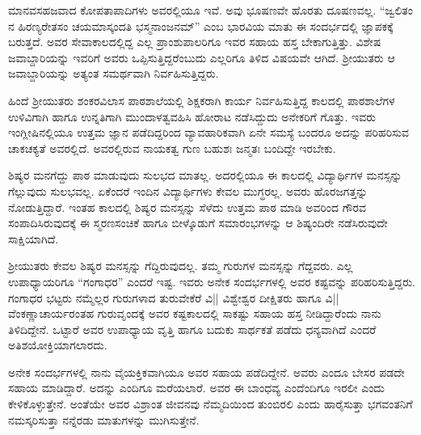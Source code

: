 ಮಾನವಸಹಜವಾದ ಕೋಪತಾಪಾದಿಗಳು ಅವರಲ್ಲಿಯೂ ಇವೆ. ಅವು ಭೂಷಣವೇ ಹೊರತು ದೂಷಣವಲ್ಲ. “ಜ್ವಲಿತಂ ನ ಹಿರಣ್ಯರೇತಸಂ ಚಯಮಾಸ್ಕಂದತಿ ಭಸ್ಮನಾಂಜನಮ್” ಎಂಬ ಭಾರವಿಯ ಮಾತು ಈ ಸಂದರ್ಭದಲ್ಲಿ ಜ್ಞಾಪಕಕ್ಕೆ ಬರುತ್ತದೆ. ಅವರ ಸೇವಾಕಾಲದಲ್ಲಿದ್ದ ಎಲ್ಲ ಪ್ರಾಂಶುಪಾಲರಿಗೂ ಇವರ ಸಹಾಯ ಹಸ್ತ ಬೇಕಾಗುತ್ತಿತ್ತು. ವಿಶೇಷ ಜವಾಬ್ದಾರಿಯನ್ನು ಇವರಿಗೆ ಅವರು ಒಪ್ಪಿಸುತ್ತಿದ್ದರೆಂಬುದು ಎಲ್ಲರಿಗೂ ತಿಳಿದ ವಿಷಯವೇ ಆಗಿದೆ. ಶ್ರೀಯುತರು ಆ ಜವಾಬ್ದಾರಿಯನ್ನು ಅತ್ಯಂತ ಸಮರ್ಥವಾಗಿ ನಿರ್ವಹಿಸುತ್ತಿದ್ದರು.

ಹಿಂದೆ ಶ್ರೀಯುತರು ಶಂಕರವಿಲಾಸ ಪಾಠಶಾಲೆಯಲ್ಲಿ ಶಿಕ್ಷಕರಾಗಿ ಕಾರ್ಯ ನಿರ್ವಹಿಸುತ್ತಿದ್ದ ಕಾಲದಲ್ಲಿ ಪಾಠಶಾಲೆಗಳ ಉಳಿವಿಗಾಗಿ ಹಾಗೂ ಉನ್ನತಿಗಾಗಿ ಮುಂದಾಳತ್ವವಹಿಸಿ ಹೋರಾಟ ನಡೆಸಿದ್ದುದು ಅನೇಕರಿಗೆ ಗೊತ್ತು. ಇವರು ಇಂಗ್ಲೀಷಿನಲ್ಲಿಯೂ ಉತ್ತಮ ಜ್ಞಾನ ಪಡೆದಿದ್ದರಿಂದ ವ್ಯಾವಹಾರಿಕವಾಗಿ ಏನೇ ಸಮಸ್ಯೆ ಬಂದರೂ ಅದನ್ನು ಪರಿಹರಿಸುವ ಚಾಕಚಕ್ಯತೆ ಅವರಲ್ಲಿದೆ. ಅವರಲ್ಲಿರುವ ನಾಯಕತ್ವ ಗುಣ ಬಹುಶಃ ಜನ್ಮತಃ ಬಂದಿದ್ದೇ ಇರಬೇಕು.

ಶಿಷ್ಯರ ಮನಗೆದ್ದು ಪಾಠ ಮಾಡುವುದು ಸುಲಭದ ಮಾತಲ್ಲ. ಅದರಲ್ಲಿಯೂ ಈ ಕಾಲದಲ್ಲಿ ವಿದ್ಯಾರ್ಥಿಗಳ ಮನಸ್ಸನ್ನು ಗೆಲ್ಲುವುದು ಸುಲಭವಲ್ಲ. ಏಕೆಂದರೆ ಇಂದಿನ ವಿದ್ಯಾರ್ಥಿಗಳು ಕೇವಲ ಮುಗ್ಧರಲ್ಲ. ಅವರು ಹೊರಜಗತ್ತನ್ನು ನೋಡುತ್ತಿದ್ದಾರೆ. ಇಂತಹ ಕಾಲದಲ್ಲಿ ಶಿಷ್ಯರ ಮನಸ್ಸನ್ನು ಸೆಳೆದು ಉತ್ತಮ ಪಾಠ ಮಾಡಿ ಅವರಿಂದ ಗೌರವ ಸಂಪಾದಿಸಿರುವುದಕ್ಕೆ ಈ ಸ್ಮರಣಸಂಚಿಕೆ ಹಾಗೂ ಬೀಳ್ಕೊಡುಗೆ ಸಮಾರಂಭಗಳನ್ನು ಆ ಶಿಷ್ಯಂದಿರೇ ನಡೆಸಿರುವುದೇ ಸಾಕ್ಷಿಯಾಗಿದೆ.

ಶ್ರೀಯುತರು ಕೇವಲ ಶಿಷ್ಯರ ಮನಸ್ಸನ್ನು ಗೆದ್ದಿರುವುದಲ್ಲ. ತಮ್ಮ ಗುರುಗಳ ಮನಸ್ಸನ್ನು ಗೆದ್ದವರು. ಎಲ್ಲ ಉಪಾಧ್ಯಾಯರಿಗೂ “ಗಂಗಾಧರ” ಎಂದರೆ ಇಷ್ಟ. ಇವರು ಅನೇಕ ಸಂದರ್ಭಗಳಲ್ಲಿ ಅವರ ಕಷ್ಟವನ್ನು ಪರಿಹರಿಸುತ್ತಿದ್ದರು. ಗಂಗಾಧರ ಭಟ್ಟರು ನಮ್ಮೆಲ್ಲರ ಗುರುಗಳಾದ ತುರುವೇಕೆರೆ ವಿ|| ವಿಶ್ವೇಶ್ವರ ದೀಕ್ಷಿತರು ಹಾಗೂ ವಿ|| ವೆಂಕಣ್ಣಾಚಾರ್ಯರಂತಹ ಗುರುವೃಂದಕ್ಕೆ ಅವರ ಕಷ್ಟಕಾಲದಲ್ಲಿ ಸಾಕಷ್ಟು ಸಹಾಯ ಹಸ್ತ ನೀಡಿದ್ದಾರೆಂದು ನಾನು ತಿಳಿದಿದ್ದೇನೆ. ಒಟ್ಟಾರೆ ಅವರ ಉಪಾಧ್ಯಾಯ ವೃತ್ತಿ ಹಾಗೂ ಬದುಕು ಸಾರ್ಥಕತೆ ಪಡೆದು ಧನ್ಯವಾಗಿದೆ ಎಂದರೆ ಅತಿಶಯೋಕ್ತಿಯಾಗಲಾರದು.

ಅನೇಕ ಸಂದರ್ಭಗಳಲ್ಲಿ ನಾನು ವೈಯಕ್ತಿಕವಾಗಿಯೂ ಅವರ ಸಹಾಯ ಪಡೆದಿದ್ದೇನೆ. ಅವರು ಎಂದೂ ಬೇಸರ ಪಡದೇ ಸಹಾಯ ಮಾಡಿದ್ದಾರೆ. ಅದನ್ನು ಎಂದಿಗೂ ಮರೆಯಲಾರೆ. ಅವರ ಈ ಬಾಂಧವ್ಯ ಎಂದೆಂದಿಗೂ ಇರಲೀ ಎಂದು ಕೇಳಿಕೊಳ್ಳುತ್ತೇನೆ. ಅಂತೆಯೇ ಅವರ ವಿಶ್ರಾಂತ ಜೀವನವು ನೆಮ್ಮದಿಯಿಂದ ತುಂಬಿರಲಿ ಎಂದು ಹಾರೈಸುತ್ತಾ ಭಗವಂತನಿಗೆ ನಮಸ್ಕರಿಸುತ್ತಾ ನನ್ನೆರಡು ಮಾತುಗಳನ್ನು ಮುಗಿಸುತ್ತೇನೆ.
